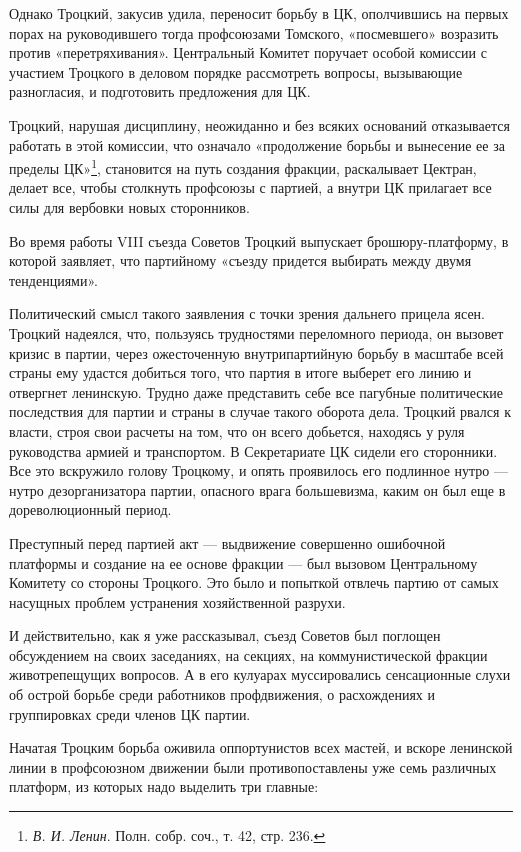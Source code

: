 \documentclass[12pt, a4paper, openany]{book}
\begin{document}
Однако Троцкий, закусив удила, переносит борьбу в ЦК, ополчившись на первых порах на руководившего тогда профсоюзами Томского, «посмевшего» возразить против «перетряхивания». Центральный Комитет поручает особой комиссии с участием Троцкого в деловом порядке рассмотреть вопросы, вызывающие разногласия, и подготовить предложения для ЦК.

Троцкий, нарушая дисциплину, неожиданно и без всяких оснований отказывается работать в этой комиссии, что означало «продолжение борьбы и вынесение ее за пределы ЦК»\footnote{\textit{В. И. Ленин}. Полн. собр. соч., т. 42, стр. 236.}, становится на путь создания фракции, раскалывает Цектран, делает все, чтобы столкнуть профсоюзы с партией, а внутри ЦК прилагает все силы для вербовки новых сторонников.

Во время работы VIII съезда Советов Троцкий выпускает брошюру-платформу, в которой заявляет, что партийному «съезду придется выбирать между двумя тенденциями».

Политический смысл такого заявления с точки зрения дальнего прицела ясен. Троцкий надеялся, что, пользуясь трудностями переломного периода, он вызовет кризис в партии, через ожесточенную внутрипартийную борьбу в масштабе всей страны ему удастся добиться того, что партия в итоге выберет его линию и отвергнет ленинскую. Трудно даже представить себе все пагубные политические последствия для партии и страны в случае такого оборота дела. Троцкий рвался к власти, строя свои расчеты на том, что он всего добьется, находясь у руля руководства армией и транспортом. В Секретариате ЦК сидели его сторонники. Все это вскружило голову Троцкому, и опять проявилось его подлинное нутро — нутро дезорганизатора партии, опасного врага большевизма, каким он был еще в дореволюционный период.

Преступный перед партией акт — выдвижение совершенно ошибочной платформы и создание на ее основе фракции — был вызовом Центральному Комитету со стороны Троцкого. Это было и попыткой отвлечь партию от самых насущных проблем устранения хозяйственной разрухи.

И действительно, как я уже рассказывал, съезд Советов был поглощен обсуждением на своих заседаниях, на секциях, на коммунистической фракции животрепещущих вопросов. А в его кулуарах муссировались сенсационные слухи об острой борьбе среди работников профдвижения, о расхождениях и группировках среди членов ЦК партии.

Начатая Троцким борьба оживила оппортунистов всех мастей, и вскоре ленинской линии в профсоюзном движении были противопоставлены уже семь различных платформ, из которых надо выделить три главные:
\end{document}
